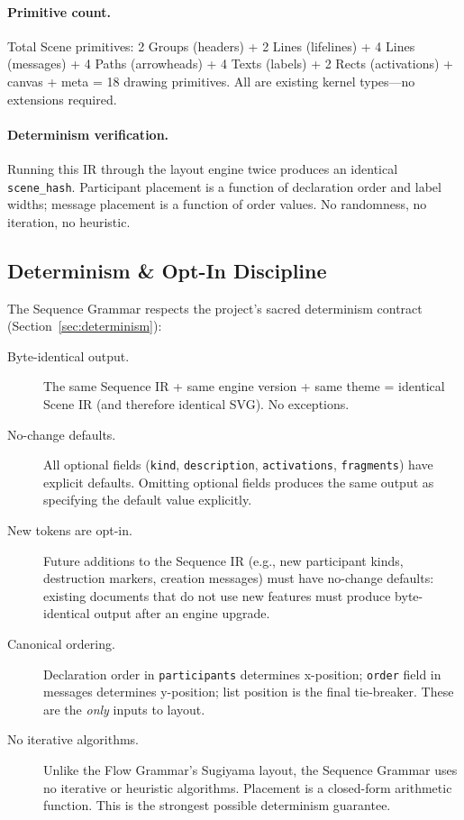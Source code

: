 \paragraph{Primitive count.}
Total Scene primitives: 2 Groups (headers) + 2 Lines (lifelines) + 4 Lines (messages) + 4 Paths (arrowheads) + 4 Texts (labels) + 2 Rects (activations) + canvas + meta = 18 drawing primitives. All are existing kernel types---no extensions required.

\paragraph{Determinism verification.}
Running this IR through the layout engine twice produces an identical \texttt{scene\_hash}. Participant placement is a function of declaration order and label widths; message placement is a function of order values. No randomness, no iteration, no heuristic.

\subsection{Determinism \& Opt-In Discipline}
\label{sec:seq-determinism}

The Sequence Grammar respects the project's sacred determinism contract (Section~\ref{sec:determinism}):

\begin{description}
  \item[Byte-identical output.] The same Sequence IR + same engine version + same theme = identical Scene IR (and therefore identical SVG). No exceptions.

  \item[No-change defaults.] All optional fields (\texttt{kind}, \texttt{description}, \texttt{activations}, \texttt{fragments}) have explicit defaults. Omitting optional fields produces the same output as specifying the default value explicitly.

  \item[New tokens are opt-in.] Future additions to the Sequence IR (e.g., new participant kinds, destruction markers, creation messages) must have no-change defaults: existing documents that do not use new features must produce byte-identical output after an engine upgrade.

  \item[Canonical ordering.] Declaration order in \texttt{participants} determines x-position; \texttt{order} field in messages determines y-position; list position is the final tie-breaker. These are the \emph{only} inputs to layout.

  \item[No iterative algorithms.] Unlike the Flow Grammar's Sugiyama layout, the Sequence Grammar uses no iterative or heuristic algorithms. Placement is a closed-form arithmetic function. This is the strongest possible determinism guarantee.
\end{description}

